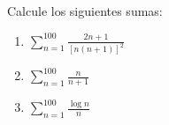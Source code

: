 \begin{frame}

Calcule los siguientes sumas:

\begin{enumerate}
\item $\sum_{n=1}^{100} \frac{2n+1}{[n(n+1)]^2}$
\item $\sum_{n=1}^{100} \frac{n}{n+1}$
\item $\sum_{n=1}^{100} \frac{\log n}{n}$
\end{enumerate}

\end{frame}


